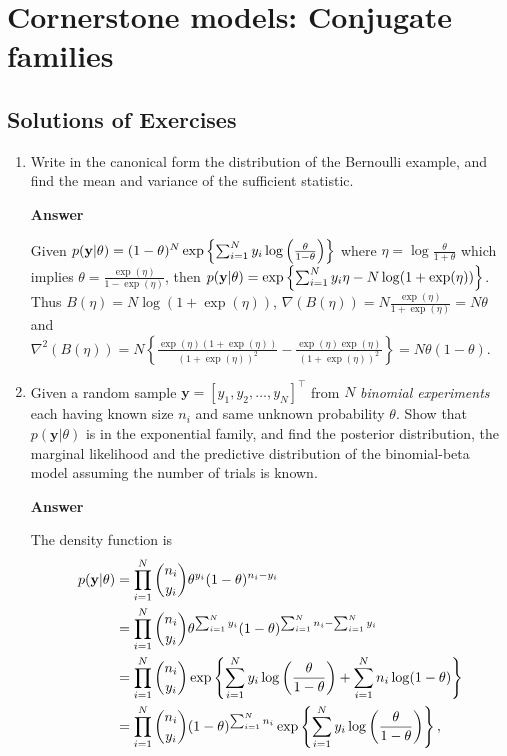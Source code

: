 \chapter{Cornerstone models: Conjugate families}\label{chap4}

\section*{Solutions of Exercises}\label{sec1}
\begin{enumerate}[leftmargin=*]
\item Write in the canonical form the distribution of the Bernoulli example, and find the mean and variance of the sufficient statistic.

\textbf{Answer}

Given $p({\bf{y}}|\theta)=(1-\theta)^N\exp\left\{\sum_{i=1}^N y_i\log\left(\frac{\theta}{1-\theta}\right)\right\}$ where $\eta=\log\frac{\theta}{1+\theta}$ which implies $\theta=\frac{\exp(\eta)}{1-\exp(\eta)}$, then $p({\bf{y}}|\theta)=\exp\left\{\sum_{i=1}^N y_i\eta-N\log(1+\exp(\eta))\right\}$. Thus $B(\eta)=N\log(1+\exp(\eta))$, $\nabla(B(\eta))=N\frac{\exp(\eta)}{1+\exp(\eta)}=N\theta$ and $\nabla^2(B(\eta))=N\left\{\frac{\exp(\eta)(1+\exp(\eta))}{(1+\exp(\eta))^2}-\frac{\exp(\eta)\exp(\eta)}{(1+\exp(\eta))^2}\right\}=N\theta(1-\theta)$. 



\item Given a random sample $\mathbf{y}=[y_1,y_2,\dots,y_N]^{\top}$ from $N$ \textit{binomial experiments} each having known size $n_i$ and same unknown probability $\theta$. Show that $p(\mathbf{y}|\theta)$ is in the exponential family, and find the posterior distribution, the marginal likelihood and the predictive distribution of the binomial-beta model assuming the number of trials is known.

\textbf{Answer}

The density function is 
\begin{align*}
p({\bf{y}}|\theta)&=\prod_{i=1}^N{n_i \choose y_i}\theta^{y_i}(1-\theta)^{n_i-y_i}\\
&=\prod_{i=1}^N{n_i \choose y_i}\theta^{\sum_{i=1}^Ny_i}(1-\theta)^{\sum_{i=1}^N n_i-\sum_{i=1}^N y_i}\\
&=\prod_{i=1}^N{n_i \choose y_i}\exp\left\{\sum_{i=1}^N y_i\log\left(\frac{\theta}{1-\theta}\right)+\sum_{i=1}^N n_i\log(1-\theta)\right\}\\
&=\prod_{i=1}^N{n_i \choose y_i}(1-\theta)^{\sum_{i=1}^N n_i}\exp\left\{\sum_{i=1}^N y_i\log\left(\frac{\theta}{1-\theta}\right)\right\},
\end{align*}
 

\end{enumerate}
